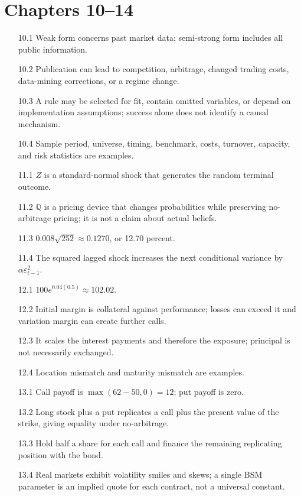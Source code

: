 \section*{Chapters 10--14}
\begin{enumerate}
  \item[10.1] Weak form concerns past market data; semi-strong form includes all public information.
  \item[10.2] Publication can lead to competition, arbitrage, changed trading costs, data-mining corrections, or a regime change.
  \item[10.3] A rule may be selected for fit, contain omitted variables, or depend on implementation assumptions; success alone does not identify a causal mechanism.
  \item[10.4] Sample period, universe, timing, benchmark, costs, turnover, capacity, and risk statistics are examples.
  \item[11.1] $Z$ is a standard-normal shock that generates the random terminal outcome.
  \item[11.2] $\mathbb Q$ is a pricing device that changes probabilities while preserving no-arbitrage pricing; it is not a claim about actual beliefs.
  \item[11.3] $0.008\sqrt{252}\approx0.1270$, or 12.70 percent.
  \item[11.4] The squared lagged shock increases the next conditional variance by $\alpha\varepsilon_{t-1}^2$.
  \item[12.1] $100e^{0.04(0.5)}\approx102.02$.
  \item[12.2] Initial margin is collateral against performance; losses can exceed it and variation margin can create further calls.
  \item[12.3] It scales the interest payments and therefore the exposure; principal is not necessarily exchanged.
  \item[12.4] Location mismatch and maturity mismatch are examples.
  \item[13.1] Call payoff is $\max(62-50,0)=12$; put payoff is zero.
  \item[13.2] Long stock plus a put replicates a call plus the present value of the strike, giving equality under no-arbitrage.
  \item[13.3] Hold half a share for each call and finance the remaining replicating position with the bond.
  \item[13.4] Real markets exhibit volatility smiles and skews; a single BSM parameter is an implied quote for each contract, not a universal constant.

\end{enumerate}
